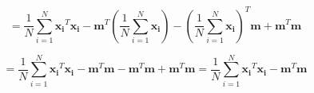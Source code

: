 \documentclass[fleqn]{article}
\begin{document}
\begin{enumerate}
		\begin{equation*}
			 = \frac{1}{N}\sum_{i=1}^{N}{\mathbf{x_i}^T\mathbf{x_i}}-\mathbf{m}^T\left(\frac{1}{N}\sum_{i=1}^{N}{\mathbf{x_i}}\right)-\left(\frac{1}{N}\sum_{i=1}^{N}{\mathbf{x_i}}\right)^T\mathbf{m}+\mathbf{m}^T\mathbf{m}
		\end{equation*}
		
		\begin{equation*}
			 = \frac{1}{N}\sum_{i=1}^{N}{\mathbf{x_i}^T\mathbf{x_i}}-\mathbf{m}^T\mathbf{m}-\mathbf{m}^T\mathbf{m}+\mathbf{m}^T\mathbf{m} = \frac{1}{N}\sum_{i=1}^{N}{\mathbf{x_i}^T\mathbf{x_i}}-\mathbf{m}^T\mathbf{m}
		\end{equation*}
		
		\end{enumerate}
\end{document}
